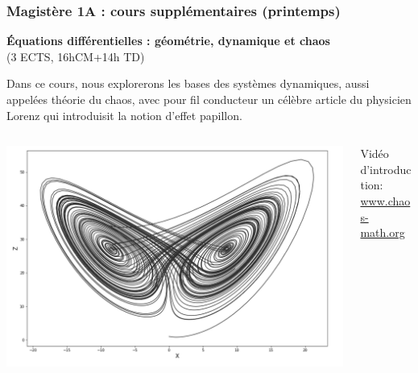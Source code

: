 \documentclass[slidetop,11pt]{beamer}
\begin{document}
\begin{frame}
\frametitle{Magistère 1A : cours supplémentaires (printemps)}

\textbf{Équations différentielles : géométrie, dynamique et chaos}\\
(3 ECTS, 16hCM+14h TD)

Dans ce cours, nous explorerons les bases des systèmes dynamiques, aussi appelées \og théorie du chaos\fg, avec pour fil conducteur un célèbre article du physicien Lorenz qui introduisit la notion d'effet papillon.
\begin{columns}[c]
\begin{column}{6cm}
\includegraphics[scale=.2]{images/Lorenz-Attractor-in-2D-space.png}
\end{column}
\begin{column}{5cm}
Vidéo d'introduction: \\
\url{www.chaos-math.org}\\
\end{column}
\end{columns}


\end{frame}
\end{document}
